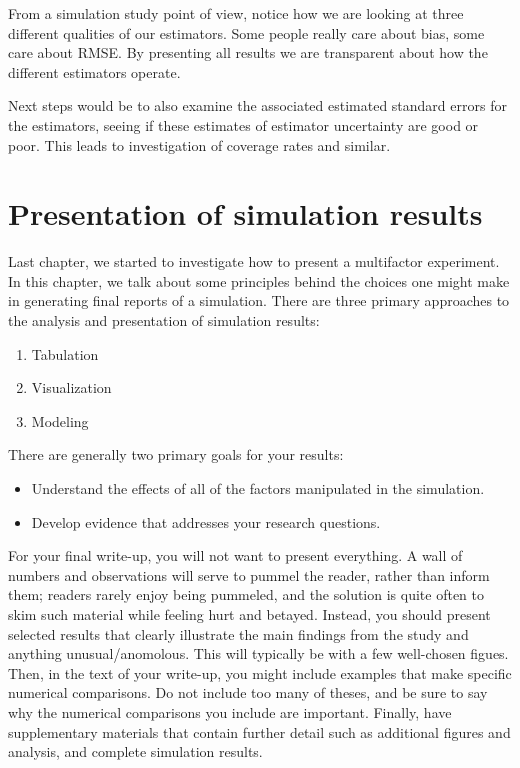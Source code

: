 \documentclass[
]{book}
\providecommand{\tightlist}{%
  \setlength{\itemsep}{0pt}\setlength{\parskip}{0pt}}
\begin{document}
From a simulation study point of view, notice how we are looking at three
different qualities of our estimators. Some people really care about bias,
some care about RMSE. By presenting all results we are transparent about how
the different estimators operate.

Next steps would be to also examine the associated estimated standard errors
for the estimators, seeing if these estimates of estimator uncertainty are
good or poor. This leads to investigation of coverage rates and similar.

\chapter{Presentation of simulation results}\label{presentation-of-simulation-results}

Last chapter, we started to investigate how to present a multifactor experiment.
In this chapter, we talk about some principles behind the choices one might make in generating final reports of a simulation.
There are three primary approaches to the analysis and presentation of simulation results:

\begin{enumerate}
\def\labelenumi{\arabic{enumi}.}
\tightlist
\item
  Tabulation
\item
  Visualization
\item
  Modeling
\end{enumerate}

There are generally two primary goals for your results:

\begin{itemize}
\tightlist
\item
  Understand the effects of all of the factors manipulated in the simulation.
\item
  Develop evidence that addresses your research questions.
\end{itemize}

For your final write-up, you will not want to present everything.
A wall of numbers and observations will serve to pummel the reader, rather than inform them; readers rarely enjoy being pummeled, and the solution is quite often to skim such material while feeling hurt and betayed.
Instead, you should present selected results that clearly illustrate the main findings from the study and anything unusual/anomolous.
This will typically be with a few well-chosen figues.
Then, in the text of your write-up, you might include examples that make specific numerical comparisons.
Do not include too many of theses, and be sure to say why the numerical comparisons you include are important.
Finally, have supplementary materials that contain further detail such as additional figures and analysis, and complete simulation results.
\end{document}
